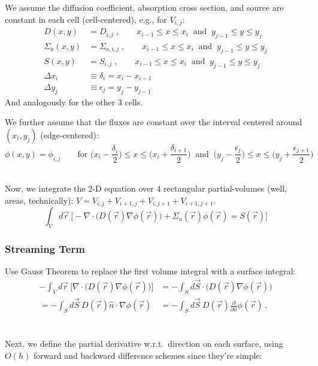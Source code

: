 \documentclass[12pt]{exam}
\begin{document}
We assume the diffusion coefficient, absorption cross section, and source are constant in each cell (cell-centered), e.g., for $V_{i,j}$:
\begin{align}
D(x,y) &= D_{i,j}\;, \qquad x_{i-1} \leq x \leq x_i \:\text{ and }\: y_{j-1} \leq y \leq y_j \nonumber \\
%
\Sigma_a(x,y) &= \Sigma_{a,i,j}\;, \qquad x_{i-1} \leq x \leq x_i \:\text{ and }\: y_{j-1} \leq y \leq y_j \nonumber \\
%
S(x,y) &= S_{i,j}\;, \qquad x_{i-1} \leq x \leq x_i \:\text{ and }\: y_{j-1} \leq y \leq y_j \nonumber \\
%
\Delta x_i &\equiv \delta_i = x_{i} - x_{i-1} \nonumber \\
\Delta y_j &\equiv \epsilon_j = y_{j} - y_{j-1} \nonumber
\end{align}
And analogously for the other 3 cells.

We further assume that the fluxes are constant over the interval centered around $(x_i, y_j)$ (edge-centered):
%
\ifprintanswers
\[\phi(x,y) = \phi_{i,j} \qquad \text{for } \bigl(x_i - \frac{\delta_i}{2}\bigr) \leq x \leq \bigl(x_i + \frac{\delta_{i+1}}{2}\bigr) \:\text{ and }\:\bigl(y_j - \frac{\epsilon_j}{2}\bigr) \leq x \leq \bigl(y_j + \frac{\epsilon_{j+1}}{2}\bigr) \]
\else
\\ \vspace*{3em}
\fi

Now, we integrate the 2-D equation over 4 rectangular partial-volumes (well, areas, technically): $V = V_{i,j} + V_{i+1,j} + V_{i,j+1} + V_{i+1,j+1}$.
%
\[\int_V d\vec{r}\:\bigl[-\nabla \cdot \bigl(D(\vec{r})\nabla \phi(\vec{r})\bigr) +\Sigma_a(\vec{r}) \phi(\vec{r}) = S(\vec{r}) \bigr]\]


\subsubsection*{Streaming Term}
Use Gauss Theorem to replace the first volume integral with a surface integral:
%
\ifprintanswers
\begin{align}
-\int_V d\vec{r}\:\bigl[\nabla \cdot \bigl(D(\vec{r})\nabla \phi(\vec{r})\bigr)\bigr] &= -\int_S d\vec{S} \cdot\bigl(D(\vec{r})\nabla \phi(\vec{r})\bigr) \nonumber \\
%
= -\int_S d\vec{S}\: D(\vec{r})\hat{n} \cdot \nabla \phi(\vec{r}) &= -\int_S d\vec{S} \:D(\vec{r})\frac{\partial}{\partial \hat{n}}\phi(\vec{r})\:. \nonumber
\end{align}
\else
\\ \vspace*{4em} \\
\fi
%
Next, we define the partial derivative w.r.t.\ direction on each surface, using $O(h)$ forward and backward difference schemes since they're simple:
\end{document}
